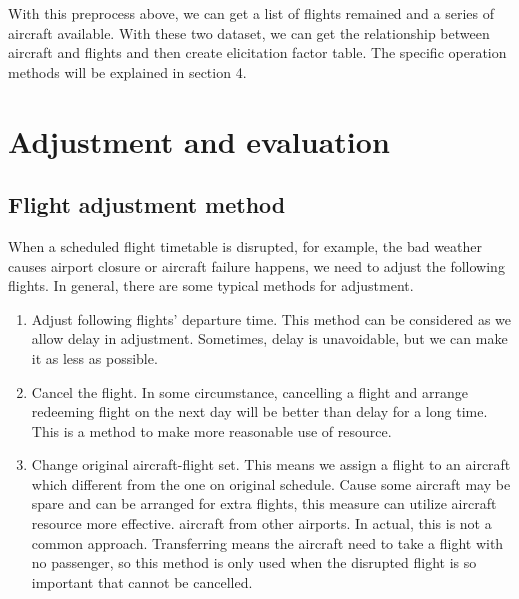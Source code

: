 \documentclass[senior]{IPSstyle}
\begin{document}
With this preprocess above, we can get a list of flights remained and a series of aircraft available. With these two dataset, we can get the relationship between aircraft and flights and then create elicitation factor table. The specific operation methods will be explained in section 4.

\section{Adjustment and evaluation}

\subsection{Flight adjustment method}
When a scheduled flight timetable is disrupted, for example, the bad weather causes airport closure or aircraft failure happens, we need to adjust the following flights. In general, there are some typical methods for adjustment.
\begin{enumerate}
    \item Adjust following flights’ departure time. This method can be considered as we allow delay in adjustment. Sometimes, delay is unavoidable, but we can make it as less as possible.
    \item Cancel the flight. In some circumstance, cancelling a flight and arrange redeeming flight on the next day will be better than delay for a long time. This is a method to make more reasonable use of resource.
    \item Change original aircraft-flight set. This means we assign a flight to an aircraft which different from the one on original schedule. Cause some aircraft may be spare and can be arranged for extra flights, this measure can utilize aircraft resource more effective.
    \itemTransfer aircraft from other airports. In actual, this is not a common approach. Transferring means the aircraft need to take a flight with no passenger, so this method is only used when the disrupted flight is so important that cannot be cancelled. 
\end{enumerate}
\end{document}
